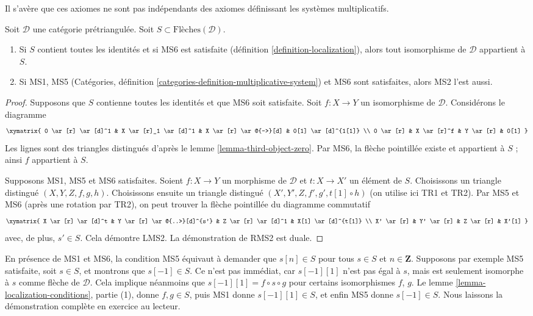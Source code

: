 \noindent
Il s'avère que ces axiomes ne sont pas indépendants des axiomes définissant les
systèmes multiplicatifs.

\begin{lemma}
\label{lemma-localization-conditions}
Soit $\mathcal{D}$ une catégorie prétriangulée.
Soit $S \subset \text{Flèches}(\mathcal{D})$.
\begin{enumerate}
\item Si $S$ contient toutes les identités et si MS6 est satisfaite
(définition \ref{definition-localization}), alors tout isomorphisme de
$\mathcal{D}$ appartient à $S$.
\item Si MS1, MS5 (Catégories, définition
\ref{categories-definition-multiplicative-system}) et MS6 sont satisfaites,
alors MS2 l'est aussi.
\end{enumerate}
\end{lemma}

\begin{proof}
Supposons que $S$ contienne toutes les identités et que MS6 soit satisfaite.
Soit $f : X \to Y$ un isomorphisme de $\mathcal{D}$.
Considérons le diagramme
$$
\xymatrix{
0 \ar[r] \ar[d]^1 &
X \ar[r]_1 \ar[d]^1 &
X \ar[r] \ar@{-->}[d] &
0[1] \ar[d]^{1[1]} \\
0 \ar[r] &
X \ar[r]^f &
Y \ar[r] &
0[1]
}
$$
Les lignes sont des triangles distingués d'après le
lemme \ref{lemma-third-object-zero}. Par MS6, la flèche pointillée existe et
appartient à $S$ ; ainsi $f$ appartient à $S$.

\medskip\noindent
Supposons MS1, MS5 et MS6 satisfaites.
Soient $f : X \to Y$ un morphisme de $\mathcal{D}$ et
$t : X \to X'$ un élément de $S$. Choisissons un triangle distingué
$(X, Y, Z, f, g, h)$. Choisissons ensuite un triangle distingué
$(X', Y', Z, f', g', t[1] \circ h)$ (on utilise ici TR1 et TR2).
Par MS5 et MS6 (après une rotation par TR2), on peut trouver la flèche
pointillée du diagramme commutatif
$$
\xymatrix{
X \ar[r] \ar[d]^t &
Y \ar[r] \ar@{..>}[d]^{s'} &
Z \ar[r] \ar[d]^1 &
X[1] \ar[d]^{t[1]} \\
X' \ar[r] &
Y' \ar[r] &
Z \ar[r] &
X'[1]
}
$$
avec, de plus, $s' \in S$. Cela démontre LMS2. La démonstration de RMS2 est
duale.
\end{proof}

\begin{remark}
\label{remark-MS5}
En présence de MS1 et MS6, la condition MS5 équivaut à demander que
$s[n] \in S$ pour tous $s \in S$ et $n \in \mathbf{Z}$. Supposons par exemple
MS5 satisfaite, soit $s \in S$, et montrons que $s[-1] \in S$. Ce n'est pas
immédiat, car $s[-1][1]$ n'est pas égal à $s$, mais est seulement isomorphe à
$s$ comme flèche de $\mathcal{D}$. Cela implique néanmoins que
$s[-1][1] = f \circ s \circ g$ pour certains isomorphismes $f$, $g$.
Le lemme \ref{lemma-localization-conditions}, partie (1), donne
$f, g \in S$, puis MS1 donne $s[-1][1] \in S$, et enfin MS5 donne
$s[-1] \in S$. Nous laissons la démonstration complète en exercice au lecteur.
\end{remark}

